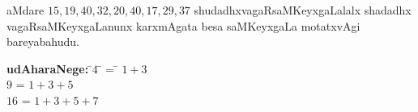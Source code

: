 aMdare $15,19,40,32,20,40,17,29,37$ shudadhxvagaRsaMKeyxgaLalalx shadadhx \-vagaRsaMKeyxgaLanunx karxmAgata besa saMKeyxgaLa motatxvAgi bareyabahudu.

\begin{tabbing}
\textbf{udAharaNege:}\quad \;\; \= \;\;$4$ \= \; = \= $1+3$\\
\> \;\;$9$ \> \; = \> $1+3+5$\\
 \> $16$ \>  \; =  \> $1+3+5+7$
\end{tabbing}
